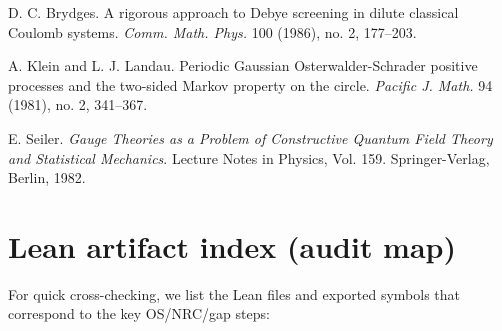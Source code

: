 \documentclass[11pt]{amsart}
\begin{document}
\begin{thebibliography}{99}
D. C. Brydges.
A rigorous approach to Debye screening in dilute classical Coulomb systems.
\emph{Comm. Math. Phys.} 100 (1986), no. 2, 177--203.

A. Klein and L. J. Landau.
Periodic Gaussian Osterwalder-Schrader positive processes and the two-sided Markov property on the circle.
\emph{Pacific J. Math.} 94 (1981), no. 2, 341--367.

E. Seiler.
\emph{Gauge Theories as a Problem of Constructive Quantum Field Theory and Statistical Mechanics}.
Lecture Notes in Physics, Vol. 159. Springer-Verlag, Berlin, 1982.

\end{thebibliography}

\appendix

\section*{Lean artifact index (audit map)}

For quick cross-checking, we list the Lean files and exported symbols that correspond to the key OS/NRC/gap steps:
\end{document}
